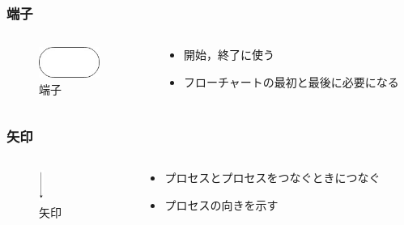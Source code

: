 \documentclass[10pt, dvipdfmx]{beamer}
\begin{document}
        \begin{frame}
            \frametitle{端子}
            \begin{columns}[c]
                \begin{column}{0.50\textwidth}
                    \begin{figure}[htb]
                        \includegraphics[height=10mm]{images/terminal.jpg}
                        \caption{端子}
                        \label{fig:05}
                    \end{figure}
                \end{column}
                \begin{column}{0.50\textwidth}
                    \begin{block}{}
                        \begin{itemize}
                            \item 開始，終了に使う
                            \item フローチャートの最初と最後に必要になる
                        \end{itemize}
                    \end{block}
                \end{column}
            \end{columns}
        \end{frame}

        \begin{frame}
            \frametitle{矢印}
            \begin{columns}[c]
                \begin{column}{0.50\textwidth}
                    \begin{figure}[htb]
                        \includegraphics[height=10mm]{images/arrow.jpg}
                        \caption{矢印}
                        \label{fig:06}
                    \end{figure}
                \end{column}
                \begin{column}{0.50\textwidth}
                    \begin{block}{}
                        \begin{itemize}
                            \item プロセスとプロセスをつなぐときにつなぐ
                            \item プロセスの向きを示す
                        \end{itemize}
                    \end{block}
                \end{column}
            \end{columns}
        \end{frame}
\end{document}
